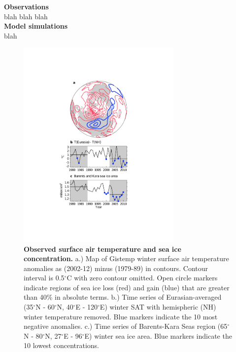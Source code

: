 \documentclass{nature}
\begin{document}
\begin{methods}
\textbf{Observations} \\
blah blah blah
\\
\textbf{Model simulations}\\
blah
\end{methods}

\begin{figure}%
\centering
\noindent\includegraphics[width=19pc]{Figure1.pdf}
\caption{\textbf{Observed surface air temperature and sea ice concentration.} a.) Map of Gistemp winter surface air temperature anomalies as (2002-12) minus (1979-89) in contours. Contour interval is 0.5$^\circ$C with zero contour omitted. Open circle markers indicate regions of sea ice loss (red) and gain (blue) that are greater than 40\% in absolute terms. b.) Time series of Eurasian-averaged (35$^\circ$N - 60$^\circ$N, 40$^\circ$E - 120$^\circ$E) winter SAT with hemispheric (NH) winter temperature removed. Blue markers indicate the 10 most negative anomalies. c.) Time series of Barents-Kara Seas region (65$^\circ$N - 80$^\circ$N, 27$^\circ$E - 96$^\circ$E) winter sea ice area. Blue markers indicate the 10 lowest concentrations.
}
\label{fig:fig1} 
\end{figure}
\end{document}
